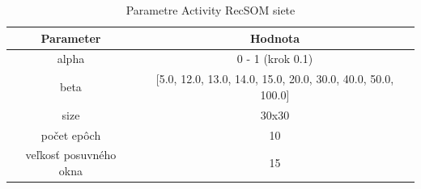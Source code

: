 \begin{table}[h!]
    \centering
    \begin{tabular}{|c|c|} 
     \hline
     Parameter & Hodnota \\ 
     \hline\hline
     alpha & 0 - 1 (krok 0.1) \\ 
     \hline
     beta & [5.0, 12.0, 13.0, 14.0, 15.0, 20.0, 30.0, 40.0, 50.0, 100.0]\\ 
     \hline
     size & 30x30  \\
     \hline
     počet epôch & 10  \\
     \hline
     veľkosť posuvného okna & 15  \\
     \hline
    \end{tabular}
    \caption{Parametre Activity RecSOM siete}
    \label{table:1}
    \end{table}
    

